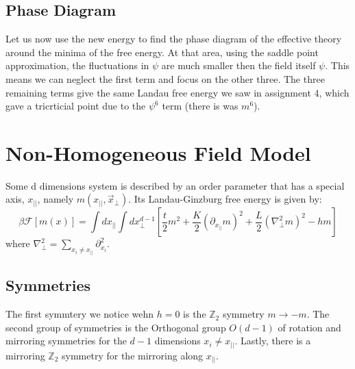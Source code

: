 \documentclass{article}
\begin{document}
\subsection{Phase Diagram}
Let us now use the new energy to find the phase diagram of the effective theory around the minima of the free energy. At that area, using the saddle point approximation, the fluctuations in $\psi$ are much smaller then the field itself $\psi$. This means we can neglect the first term and focus on the other three. The three remaining terms give the same Landau free energy we saw in assignment 4, which gave a tricrticial point due to the $\psi^6$ term (there is was $m^6$).

\section{Non-Homogeneous Field Model}
Some d dimensions system is described by an order parameter that has a special
axis, $x_{||}$, namely $m(x_{||}, \vec{x}_{\perp})$. Its Landau-Ginzburg free energy is given by:
\begin{equation}
    \beta \mathcal{F}[m(x)] = \int dx_{||} \int dx^{d-1}_{\perp} \left[
        \frac{t}{2}m^2 + \frac{K}{2}\left(\partial_{x_{||}} m\right)^2  + \frac{L}{2}\left(\nabla_{\perp}^2 m\right)^2 - hm
    \right]
\end{equation}
where $\nabla_{\perp}^2 = \sum_{x_i \ne x_{||}}\partial_{x_i}^2$.
\subsection{Symmetries}
The first symmtery we notice wehn $h = 0$ is the $\mathbb{Z}_2$ symmetry $m \rightarrow -m$. The second group of symmetries is the Orthogonal group $O(d - 1)$ of rotation and mirroring symmetries for the $d - 1$ dimensions $x_i \ne x_{||}$. Lastly, there is a mirroring $\mathbb{Z}_2$ symmetry for the mirroring along $x_{||}$.
\end{document}
